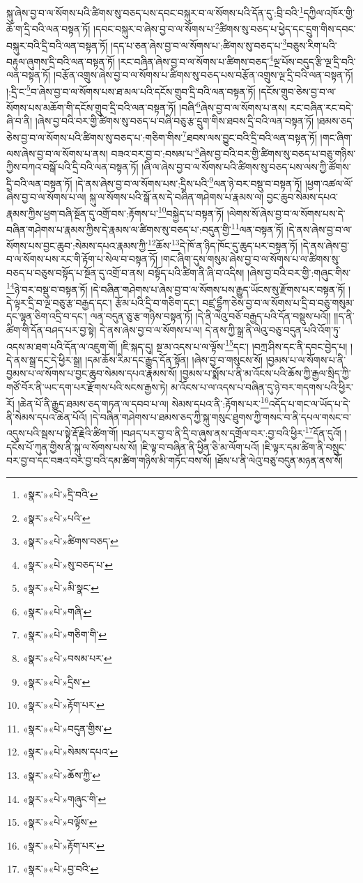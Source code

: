 སྐུ་ཞེས་བྱ་བ་ལ་སོགས་པའི་ཚིགས་སུ་བཅད་པས་དབང་བསྐུར་བ་ལ་སོགས་པའི་དོན་དུ་:བྲི་བའི་\footnote{«སྣར་»«པེ་»དྲི་བའི་}དཀྱིལ་འཁོར་གྱི་ཆོ་ག་དྲི་བའི་ལན་བསྟན་ཏོ། །དབང་བསྐུར་བ་ཞེས་བྱ་བ་ལ་སོགས་པ་\footnote{«སྣར་»«པེ་»པའི་}ཚིགས་སུ་བཅད་པ་ཕྱེད་དང་དྲུག་གིས་དབང་བསྐུར་བའི་དྲི་བའི་ལན་བསྟན་ཏོ། །དད་པ་ཅན་ཞེས་བྱ་བ་ལ་སོགས་པ་:ཚིགས་སུ་བཅད་པ་\footnote{«སྣར་»«པེ་»ཚིགས་བཅད་}བཅུས་རིག་པའི་བརྟུལ་ཞུགས་དྲི་བའི་ལན་བསྟན་ཏོ། །རང་བཞིན་ཞེས་བྱ་བ་ལ་སོགས་པ་ཚིགས་བཅད་\footnote{«སྣར་»«པེ་»སུ་བཅད་པ་}ལྔ་པོས་བདུད་རྩི་ལྔ་དྲི་བའི་ལན་བསྟན་ཏོ། །བརྩོན་འགྲུས་ཞེས་བྱ་བ་ལ་སོགས་པ་ཚིགས་སུ་བཅད་པས་བརྩོན་འགྲུས་ལྔ་དྲི་བའི་ལན་བསྟན་ཏོ། །:དྲི་ང་\footnote{«སྣར་»«པེ་»མི་སྣང་}བ་ཞེས་བྱ་བ་ལ་སོགས་པས་ཐ་མལ་པའི་དངོས་གྲུབ་དྲི་བའི་ལན་བསྟན་ཏོ། །དངོས་གྲུབ་ཅེས་བྱ་བ་ལ་སོགས་པས་མཆོག་གི་དངོས་གྲུབ་དྲི་བའི་ལན་བསྟན་ཏོ། །བཞི་\footnote{«སྣར་»«པེ་»གཞི་}ཞེས་བྱ་བ་ལ་སོགས་པ་ནས། རང་བཞིན་རང་བདེ་ཞི་བ་ནི། །ཞེས་བྱ་བའི་བར་གྱི་ཚིགས་སུ་བཅད་པ་བཞི་བཅུ་རྩ་དྲུག་གིས་ཐབས་དྲི་བའི་ལན་བསྟན་ཏོ། །ཐམས་ཅད་ཅེས་བྱ་བ་ལ་སོགས་པའི་ཚིགས་སུ་བཅད་པ་:གཅིག་གིས་\footnote{«སྣར་»«པེ་»གཅིག་གི་}ཐབས་ལས་བྱུང་བའི་དྲི་བའི་ལན་བསྟན་ཏོ། །གང་ཞིག་ལས་ཞེས་བྱ་བ་ལ་སོགས་པ་ནས། བཟའ་བར་བྱ་བ་:བསམ་པ་\footnote{«སྣར་»«པེ་»བསམ་པར་}ཞེས་བྱ་བའི་བར་གྱི་ཚིགས་སུ་བཅད་པ་བཅུ་གཉིས་ཀྱིས་བཀའ་བསྒོ་པའི་དྲི་བའི་ལན་བསྟན་ཏོ། །ཞི་ལ་ཞེས་བྱ་བ་ལ་སོགས་པའི་ཚིགས་སུ་བཅད་པས་ལས་ཀྱི་ཚོགས་དྲི་བའི་ལན་བསྟན་ཏོ། །དེ་ནས་ཞེས་བྱ་བ་ལ་སོགས་པས་:དྲིས་པའི་\footnote{«སྣར་»«པེ་»དྲིས་}ལན་ཉེ་བར་བསྡུ་བ་བསྟན་ཏོ། །ཕྱག་འཚལ་ལོ་ཞེས་བྱ་བ་ལ་སོགས་པ་ལ། སྐུ་ལ་སོགས་པའི་སྒོ་ནས་དེ་བཞིན་གཤེགས་པ་རྣམས་ལ། བྱང་ཆུབ་སེམས་དཔའ་རྣམས་ཀྱིས་ཕྱག་བཞི་སྔོན་དུ་འགྲོ་བས་:རྟོགས་པ་\footnote{«སྣར་»«པེ་»རྟོག་པར་}བསྐྱེད་པ་བསྟན་ཏོ། །ལེགས་སོ་ཞེས་བྱ་བ་ལ་སོགས་པས་དེ་བཞིན་གཤེགས་པ་རྣམས་ཀྱིས་དེ་རྣམས་ལ་ཚིགས་སུ་བཅད་པ་:བདུན་གྱི་\footnote{«སྣར་»«པེ་»བདུན་གྱིས་}ལན་བསྟན་ཏོ། །དེ་ནས་ཞེས་བྱ་བ་ལ་སོགས་པས་བྱང་ཆུབ་:སེམས་དཔའ་རྣམས་ཀྱི་\footnote{«སྣར་»«པེ་»སེམས་དཔའ་}ཆོས་\footnote{«སྣར་»«པེ་»ཆོས་ཀྱི་}དེ་ཁོ་ན་ཉིད་ཁོང་དུ་ཆུད་པར་བསྟན་ཏོ། །དེ་ནས་ཞེས་བྱ་བ་ལ་སོགས་པས་རང་གི་རྟོག་པ་སེལ་བ་བསྟན་ཏོ། །གང་ཞིག་དུས་གསུམ་ཞེས་བྱ་བ་ལ་སོགས་པ་ལ་ཚིགས་སུ་བཅད་པ་བཅུས་བསྟོད་པ་སྔོན་དུ་འགྲོ་བ་ནས། བསྟོད་པའི་ཚིག་ནི་ཞི་བ་འདིས། །ཞེས་བྱ་བའི་བར་གྱི་:གཞུང་གིས་\footnote{«སྣར་»«པེ་»གཞུང་གི་}ཉེ་བར་བསྡུ་བ་བསྟན་ཏོ། །དེ་བཞིན་གཤེགས་པ་ཞེས་བྱ་བ་ལ་སོགས་པས་རྒྱུད་ཡོངས་སུ་རྫོགས་པར་བསྟན་ཏོ། །དེ་ལྟར་དྲི་བ་ལྔ་བཅུ་རྩ་བརྒྱད་དང་། རྩོམ་པའི་དྲི་བ་གཅིག་དང་། བཛྲ་དྷྲྀཀ་ཅེས་བྱ་བ་ལ་སོགས་པ་དྲི་བ་བཅུ་གསུམ་དང་ལྷན་ཅིག་འདྲི་བ་དང་། ལན་བདུན་ཅུ་རྩ་གཉིས་བསྟན་ཏོ། །དེ་ནི་ལེའུ་བཅོ་བརྒྱད་པའི་དོན་བསྡུས་པའོ།། །།ད་ནི་ཚིག་གི་དོན་བཤད་པར་བྱ་སྟེ། དེ་ནས་ཞེས་བྱ་བ་ལ་སོགས་པ་ལ། དེ་ནས་ཀྱི་སྒྲ་ནི་ལེའུ་བཅུ་བདུན་པའི་འོག་ཏུ་འདས་མ་ཐག་པའི་དོན་ལ་འཇུག་གོ། །ཇི་སྐད་དུ། སྔ་མ་འདས་པ་ལ་ལྟོས་\footnote{«སྣར་»«པེ་»བལྟོས་}དང་། །བཀྲ་ཤིས་དང་ནི་དབང་བྱེད་པ། །དེ་ནས་སྒྲ་དང་དེ་ཕྱིར་སྒྲ། །དམ་ཆོས་རིམ་དང་རྒྱུད་དོན་སྟོན། །ཞེས་བྱ་བ་གསུངས་སོ། །བྱམས་པ་ལ་སོགས་པ་ནི་བྱམས་པ་ལ་སོགས་པ་བྱང་ཆུབ་སེམས་དཔའ་རྣམས་སོ། །བྱམས་པ་སྨོས་པ་ནི་མ་འོངས་པའི་ཆོས་ཀྱི་རྒྱལ་སྲིད་ཀྱི་གཙོ་བོར་ནི་ཡང་དག་པར་རྫོགས་པའི་སངས་རྒྱས་ཏེ། མ་འོངས་པ་ལ་འདས་པ་བཞིན་དུ་ཉེ་བར་གདགས་པའི་ཕྱིར་རོ། །ཆེན་པོ་ནི་རྒྱུད་ཐམས་ཅད་གཏན་ལ་དབབ་པ་ལ། སེམས་དཔའ་ནི་:རྟོགས་པར་\footnote{«སྣར་»«པེ་»རྟོག་པར་}འདོད་པ་གང་ལ་ཡོད་པ་དེ་ནི་སེམས་དཔའ་ཆེན་པོའོ། །དེ་བཞིན་གཤེགས་པ་ཐམས་ཅད་ཀྱི་སྐུ་གསུང་ཐུགས་ཀྱི་གསང་བ་ནི་དཔལ་གསང་བ་འདུས་པའི་སྦས་པ་སྟེ་རྡོ་རྗེའི་ཚིག་གོ། །བཤད་པར་བྱ་བ་ནི་དྲི་བ་ཞུས་ནས་དགྲོལ་བར་:བྱ་བའི་ཕྱིར་\footnote{«སྣར་»«པེ་»བྱ་བའི་}དོན་དུའོ། །དངོས་པོ་ཀུན་གྱིས་ནི་སྐུ་ལ་སོགས་པས་སོ། །ཇི་ལྟ་བ་བཞིན་ནི་ཕྱིན་ཅི་མ་ལོག་པའོ། །ཇི་ལྟར་དམ་ཚིག་ནི་བསྲུང་བར་བྱ་བ་དང་བཟའ་བར་བྱ་བའི་དམ་ཚིག་གཉིས་མི་གཏོང་བས་སོ། །ཐོས་པ་ནི་ལེའུ་བཅུ་བདུན་མཉན་ནས་སོ། 